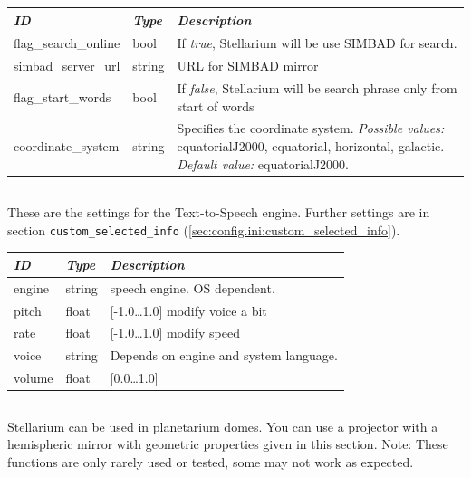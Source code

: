\begin{tabularx}{\textwidth}{l|l|X}\toprule
\emph{ID} & \emph{Type} & \emph{Description}\\\midrule
flag\_search\_online & bool   & If \emph{true}, Stellarium will be use SIMBAD for search.\\%
simbad\_server\_url  & string & URL for SIMBAD mirror\\%
flag\_start\_words   & bool   & If \emph{false}, Stellarium will be search phrase only from start of words\\%
coordinate\_system   & string & Specifies the coordinate system. 
                                \emph{Possible values:} equatorialJ2000, equatorial, horizontal, galactic. \emph{Default value:} equatorialJ2000.\\
\bottomrule
\end{tabularx}

\subsection{}
\label{sec:config.ini:speech}

These are the settings for the Text-to-Speech engine. 
Further settings are in section \texttt{custom\_selected\_info} (\ref{sec:config.ini:custom_selected_info}).

\noindent
\begin{tabularx}{\textwidth}{l|l|X}\toprule
\emph{ID} & \emph{Type} &  \emph{Description}\\\midrule
engine    & string &  speech engine. OS dependent. \\
pitch     & float  &  [-1.0\ldots1.0] modify voice a bit \\
rate      & float  &  [-1.0\ldots1.0] modify speed \\
voice     & string &  Depends on engine and system language. \\
volume    & float  &  [0.0\ldots1.0]\\
\bottomrule
\end{tabularx}

\subsection{}

Stellarium can be used in planetarium domes. You can use a projector with a hemispheric mirror with geometric properties given in this section. 
Note: These functions are only rarely used or tested, some may not work as expected.
 
